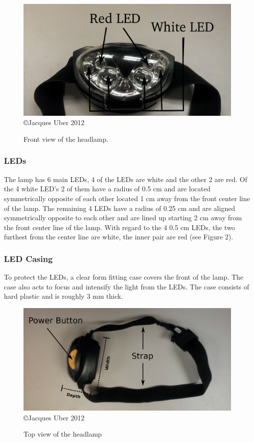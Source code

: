 \documentclass[12pt]{article}
\begin{document}
\begin{figure}[h!]
\centering
\label{Figure Derp}
\caption[Front view of the headlamp] {Front view of the headlamp.}
\includegraphics[width=5in]{headlamp}
\\ {\tiny \copyright  Jacques Uber 2012}
\end{figure}

\subsubsection{LEDs}
The lamp has 6 main LEDs, 4 of the LEDs are white and the other 2 are red. Of the 4 white LED's
2 of them have a radius of 0.5 cm and are located symmetrically opposite of each other located 1 cm
away from the front center line of the lamp.  The remaining 4 LEDs have a radius of 0.25 cm and are
aligned symmetrically opposite to each other and are lined up starting 2 cm away from the front
center line of the lamp. With regard to the 4 0.5 cm LEDs, the two furthest from the center line are
white, the inner pair are red (see Figure 2).

\subsubsection{LED Casing}
To protect the LEDs, a clear form fitting case covers the front of the lamp.  The case also acts to
focus and intensify the light from the LEDs. The case consists of hard plastic and is roughly
3 mm thick.

\begin{figure}[h!]
\centering
\caption[Top view of the headlamp] {Top view of the headlamp}
\includegraphics[width=5in]{headlamp_top}
\\ {\tiny \copyright  Jacques Uber 2012}
\end{figure}
\end{document}
